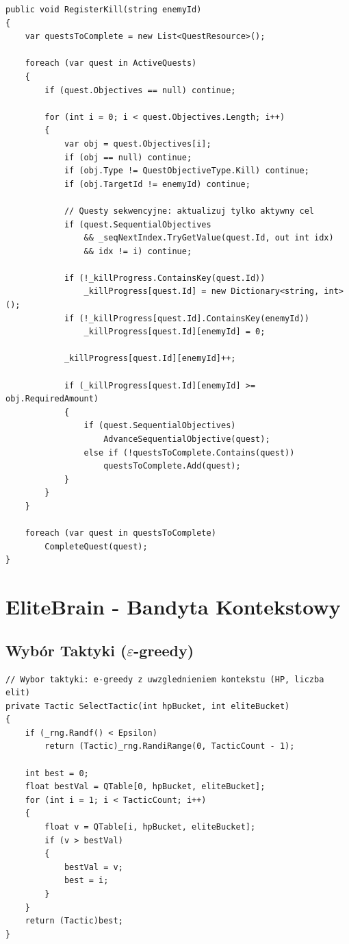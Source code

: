 \begin{lstlisting}[caption={QuestManager.cs - RegisterKill},label={lst:qm-kill}]
public void RegisterKill(string enemyId)
{
    var questsToComplete = new List<QuestResource>();

    foreach (var quest in ActiveQuests)
    {
        if (quest.Objectives == null) continue;

        for (int i = 0; i < quest.Objectives.Length; i++)
        {
            var obj = quest.Objectives[i];
            if (obj == null) continue;
            if (obj.Type != QuestObjectiveType.Kill) continue;
            if (obj.TargetId != enemyId) continue;

            // Questy sekwencyjne: aktualizuj tylko aktywny cel
            if (quest.SequentialObjectives
                && _seqNextIndex.TryGetValue(quest.Id, out int idx)
                && idx != i) continue;

            if (!_killProgress.ContainsKey(quest.Id))
                _killProgress[quest.Id] = new Dictionary<string, int>();
            if (!_killProgress[quest.Id].ContainsKey(enemyId))
                _killProgress[quest.Id][enemyId] = 0;

            _killProgress[quest.Id][enemyId]++;

            if (_killProgress[quest.Id][enemyId] >= obj.RequiredAmount)
            {
                if (quest.SequentialObjectives)
                    AdvanceSequentialObjective(quest);
                else if (!questsToComplete.Contains(quest))
                    questsToComplete.Add(quest);
            }
        }
    }

    foreach (var quest in questsToComplete)
        CompleteQuest(quest);
}
\end{lstlisting}

\section{EliteBrain - Bandyta Kontekstowy}

\subsection{Wybór Taktyki ($\varepsilon$-greedy)}

\begin{lstlisting}[caption={EliteBrain.SelectTactic},label={lst:eb-select}]
// Wybor taktyki: e-greedy z uwzglednieniem kontekstu (HP, liczba elit)
private Tactic SelectTactic(int hpBucket, int eliteBucket)
{
    if (_rng.Randf() < Epsilon)
        return (Tactic)_rng.RandiRange(0, TacticCount - 1);

    int best = 0;
    float bestVal = QTable[0, hpBucket, eliteBucket];
    for (int i = 1; i < TacticCount; i++)
    {
        float v = QTable[i, hpBucket, eliteBucket];
        if (v > bestVal)
        {
            bestVal = v;
            best = i;
        }
    }
    return (Tactic)best;
}
\end{lstlisting}

